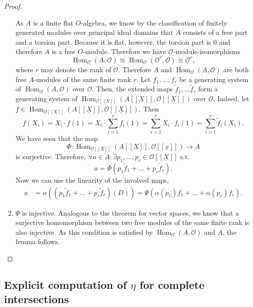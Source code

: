 \documentclass{article}
\theoremstyle{plain}%
\theoremstyle{definition}
\theoremstyle{remark}
\renewcommand{\hom}{\operatorname{Hom}}
\begin{document}
\begin{proof}
\begin{enumerate}
        As \(A\) is a finite flat \(O\)-algebra, we know by the classification of finitely generated modules
        over principal ideal domains that \(A\) consists of a free part and a torsion part. Because it is flat,
        however, the torsion part is 0 and therefore \(A\) is a free \(O\)-module.
        Therefore we have \(\mathcal{O}\)-module-isomorphisms
        \[
            \hom_\mathcal{O}(A, \mathcal{O}) \cong \hom_\mathcal{O}(\mathcal{O}^r, \mathcal{O})
            \cong \mathcal{O}^r,
        \]
        where \(r\) may denote the rank of \(\mathcal{O}\). 
        Therefore \(A\) and \(\hom_\mathcal{O}(A, \mathcal{O})\) are both free \(A\)-modules of the 
        same finite rank \(r\).
        Let \(f_1, \dots, f_r\) be a generating system of \(\hom_\mathcal{O}(A, \mathcal{O})\) over
        \(\mathcal{O}\). Then, the extended maps \(\tilde f_1, \dots \tilde f_r\) form a generating
        system of \(\hom_{\mathcal{O}[[X]]}(A[[\underline{X}]], \mathcal{O}[[\underline{X}]])\) over
        \(\mathcal{O}\). Indeed, let 
        \(f \in \hom_{\mathcal{O}[[X]]}(A[[\underline{X}]], \mathcal{O}[[\underline{X}]])\).
        Then
        \[ 
            f(X_i) = X_i \cdot f(1) = X_i \cdot \sum_{i=1}^r f_i(1) = \sum_{i=1}^r X_i \cdot f_i(1) 
            = \sum_{i=1}^r \tilde f_i(X_i).
        \]
        We have seen that the map 
        \[
            \Phi\colon \hom_{\mathcal{O}[[\underline{X}]]}(A[[\underline{X}]], \mathcal{O}[[\underline{x}]]) \to A
        \] 
        is surjective.
        Therefore, \(\forall a \in A\colon \exists p_1, \dots, p_r \in \mathcal{O}[[\underline{X}]]\) s.t.
        \[
            a = \Phi(p_1 \tilde f_1 + \dots + p_r \tilde f_r).
        \]
        Now we can use the linearity of the involved maps,
        \begin{align*} 
                a &= \alpha((p_1 \tilde f_1 + \dots + p_r \tilde f_r)(D))
                = \Psi(\alpha(p_1) f_1 + \dots + \alpha(p_r) f_r).
        \end{align*}
        \item \(\Psi\) is injective.
        Analogous to the theorem for vector spaces, we know that a surjective homomorphism between two free modules 
        of the same finite rank is also injective.
        As this condition is satisfied by \(\hom_\mathcal{O}(A, \mathcal{O})\) and \(A\), 
        the lemma follows.
    \end{enumerate}
\end{proof}

\subsection{Explicit computation of \texorpdfstring{\(\eta\)}{η} for complete intersections}
\end{document}
